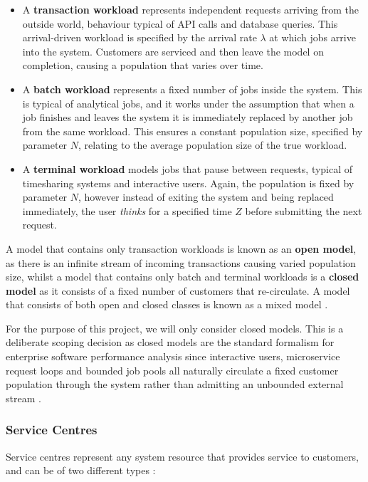 \begin{itemize}
\item A \textbf{transaction workload} represents independent requests arriving from the outside world, behaviour typical of API calls and database queries. This arrival-driven workload is specified by the arrival rate $\lambda$ at which jobs arrive into the system. Customers are serviced and then leave the model on completion, causing a population that varies over time.
\item A \textbf{batch workload} represents a fixed number of jobs inside the system. This is typical of analytical jobs, and it works under the assumption that when a job finishes and leaves the system it is immediately replaced by another job from the same workload. This ensures a constant population size, specified by parameter $N$, relating to the average population size of the true workload.
\item A \textbf{terminal workload} models jobs that pause between requests, typical of timesharing systems and interactive users. Again, the population is fixed by parameter $N$, however instead of exiting the system and being replaced immediately, the user \textit{thinks} for a specified time $Z$ before submitting the next request.
\end{itemize}

A model that contains only transaction workloads is known as an \textbf{open model}, as there is an infinite stream of incoming transactions causing varied population size, whilst a model that contains only batch and terminal workloads is a \textbf{closed model} as it consists of a fixed number of customers that re-circulate. A model that consists of both open and closed classes is known as a mixed model \cite{lazowska84}.

For the purpose of this project, we will only consider closed models. This is a deliberate scoping decision as closed models are the standard formalism for enterprise software performance analysis since interactive users, microservice request loops and bounded job pools all naturally circulate a fixed customer population through the system rather than admitting an unbounded external stream \cite{lazowska84}.

\subsubsection*{Service Centres}

Service centres represent any system resource that provides service to customers, and can be of two different types \cite{lazowska84}:

